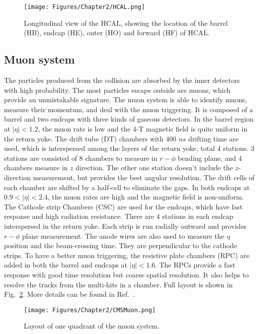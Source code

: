 \begin{figure}[t]
  \centering
  \texttt{[image: Figures/Chapter2/HCAL.png]}
  \caption{Longitudinal view of the HCAL, showing the location of the barrel (HB), endcap (HE), outer (HO) and forward (HF) of HCAL.}
  \label{fig:CMSHCAL}
\end{figure}

\subsection{Muon system} \label{ssec:muon}

The particles produced from the collision are absorbed by the inner detectors with high probability.
The most particles escape outside are muons, which provide an unmistakable signature.
The muon system is able to identify muons, measure their momentum, and deal with the muon triggering.
It is composed of a barrel and two endcaps with three kinds of gaseous detectors. 
In the barrel region at $\vert\eta\vert < 1.2$, the muon rate is low and the 4-T magnetic field is quite uniform in the return yoke.
The drift tube (DT) chambers with 400 $ns$ drifting time are used, which is interspersed among the layers of the return yoke, total 4 stations.
3 stations are consisted of 8 chambers to measure in $r-\phi$ bending plane, and 4 chambers measure in $z$ direction.
The other one station doesn't include the $z$-direction measurement, but provides the best angular resolution.
The drift cells of each chamber are shifted by a half-cell to eliminate the gaps.
In both endcaps at $0.9 < \vert\eta\vert < 2.4$, the muon rates are high and the magnetic field is non-uniform.
The Cathode strip Chambers (CSC) are used for the endcaps, which have fast response and high radiation resistance.
There are 4 stations in each endcap interspersed in the return yoke. Each strip is run radially outward and provides $r-\phi$ plane measurement.
The anode wires are also used to measure the $\eta$ position and the beam-crossing time. They are perpendicular to the cathode strips.
To have a better muon triggering, the resistive plate chambers (RPC) are added in both the barrel and endcaps at $\vert\eta\vert < 1.6$.
The RPCs provide a fast response with good time resolution but coarse spatial resolution.
It also helps to resolve the tracks from the multi-hits in a chamber.
Full layout is shown in Fig.~\ref{fig:CMSMuon}.
More details can be found in Ref.~\cite{CMS:MuonTDR}.

\begin{figure}[t]
  \centering
  \texttt{[image: Figures/Chapter2/CMSMuon.png]}
  \caption{Layout of one quadrant of the muon system.}
  \label{fig:CMSMuon}
\end{figure}

